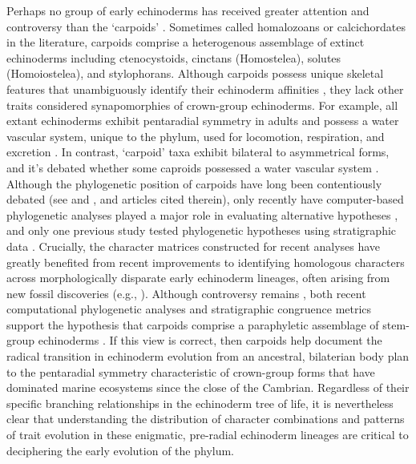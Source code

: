 \documentclass{article}
\begin{document}
Perhaps no group of early echinoderms has received greater attention and controversy than the `carpoids’ \citep{RahmanMakingSenseofCarpoids2009}. Sometimes called homalozoans or calcichordates in the literature, carpoids comprise a heterogenous assemblage of extinct echinoderms including ctenocystoids, cinctans (Homostelea), solutes (Homoiostelea), and stylophorans. Although carpoids possess unique skeletal features that unambiguously identify their echinoderm affinities \citep{DavidEtAl2000, Bottjer2006, RahmanMakingSenseofCarpoids2009, ZamoraEtAl2020}, they lack other traits considered synapomorphies of crown-group echinoderms. For example, all extant echinoderms exhibit pentaradial symmetry in adults and possess a water vascular system, unique to the phylum, used for locomotion, respiration, and excretion \citep{Nichols1972}.  In contrast, ‘carpoid’ taxa exhibit bilateral to asymmetrical forms, and it’s debated whether some caproids possessed a water vascular system \citep{Smith2005, LefebvreEtAl2019}. Although the phylogenetic position of carpoids have long been contentiously debated (see \citealp{RahmanMakingSenseofCarpoids2009} and \citealp{Rahman2009b}, and articles cited therein), only recently have computer-based phylogenetic analyses played a major role in evaluating alternative hypotheses \citep{Sumrall1997, SmithAndZamora2013, ZamoraRahman2014}, and only one previous study tested phylogenetic hypotheses using stratigraphic data \citep{Rahman2009b}. Crucially, the character matrices constructed for recent analyses have greatly benefited from recent improvements to identifying homologous characters across morphologically disparate early echinoderm lineages, often arising from new fossil discoveries (e.g., \citealp{ZamoraEtAl2012, SmithAndZamora2013}). Although controversy remains \citep{DavidEtAl2000}, both recent computational phylogenetic analyses and stratigraphic congruence metrics support the hypothesis that carpoids comprise a paraphyletic assemblage of stem-group echinoderms \citep{Rahman2009b, SmithAndZamora2013, ZamoraRahman2014}. If this view is correct, then carpoids help document the radical transition in echinoderm evolution from an ancestral, bilaterian body plan to the pentaradial symmetry characteristic of crown-group forms that have dominated marine ecosystems since the close of the Cambrian. Regardless of their specific branching relationships in the echinoderm tree of life, it is nevertheless clear that understanding the distribution of character combinations and patterns of trait evolution in these enigmatic, pre-radial echinoderm lineages are critical to deciphering the early evolution of the phylum.
\end{document}
